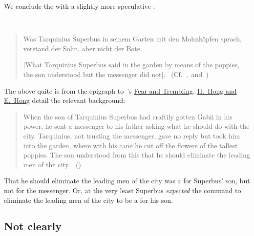 \begin{note}[Poppies]
  We conclude the  with a slightly more speculative :
  \begin{illustration}[Poppies]
    \mbox{ }
    \vspace{-\baselineskip}
    \begin{quote}
      Was Tarquinius Superbus in seinem Garten mit den Mohnköpfen sprach, verstand der Sohn, aber nicht der Bote.

      [What Tarquinius Superbus said in the garden by means of the poppies, the son understood but the messenger did not].\newline
    \mbox{ }\hfill\mbox{(Cf.~\cite[3]{Kierkegaard:1983ta}, and~\cite[190]{Hamann:1822vp})}
  \end{quote}
  \vspace{-\baselineskip}
  \end{illustration}
  The above quite is from the epigraph to~\citeauthor{Kierkegaard:1983ta}'s \hyperlink{cite.Kierkegaard:1983ta}{Fear and Trembling}.
  \hyperlink{cite.Kierkegaard:1983ta}{H.\ Hong and E.\ Hong} detail the relevant background:

  \begin{quote}
    When the son of Tarquinius Superbus had craftily gotten Gabii in his power, he sent a messenger to his father asking what he should do with the city.
    Tarquinius, not trusting the messenger, gave no reply but took him into the garden, where with his cane he cut off the flowers of the tallest poppies.
    The son understood from this that he should eliminate the leading men of the city.%
    \mbox{ }\hfill\mbox{(\citeyear[339]{Kierkegaard:1983ta})}
  \end{quote}
  That he should eliminate the leading men of the city was a  for Superbus' son, but not for the messenger.
  Or, at the very least Superbus \emph{expected} the command to eliminate the leading men of the city to be a \fc{} for his son.
\end{note}

\subsection{Not clearly }
\label{cha:fcs:sec:illu:no}

